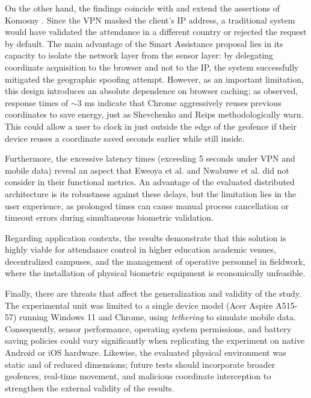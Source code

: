 \documentclass[runningheads]{llncs}
\begin{document}
On the other hand, the findings coincide with and extend the assertions of Komosny \cite{komosny2023}. Since the VPN masked the client's IP address, a traditional system would have validated the attendance in a different country or rejected the request by default. The main advantage of the Smart Assistance proposal lies in its capacity to isolate the network layer from the sensor layer: by delegating coordinate acquisition to the browser and not to the IP, the system successfully mitigated the geographic spoofing attempt. However, as an important limitation, this design introduces an absolute dependence on browser caching; as observed, response times of $\sim$3 ms indicate that Chrome aggressively reuses previous coordinates to save energy, just as Shevchenko and Reips \cite{shevchenko2024} methodologically warn. This could allow a user to clock in just outside the edge of the geofence if their device reuses a coordinate saved seconds earlier while still inside.

Furthermore, the excessive latency times (exceeding 5 seconds under VPN and mobile data) reveal an aspect that Eweoya et al. \cite{eweoya2025} and Nwabuwe et al. \cite{nwabuwe2023} did not consider in their functional metrics. An advantage of the evaluated distributed architecture is its robustness against these delays, but the limitation lies in the user experience, as prolonged times can cause manual process cancellation or timeout errors during simultaneous biometric validation.

Regarding application contexts, the results demonstrate that this solution is highly viable for attendance control in higher education academic venues, decentralized campuses, and the management of operative personnel in fieldwork, where the installation of physical biometric equipment is economically unfeasible.

Finally, there are threats that affect the generalization and validity of the study. The experimental unit was limited to a single device model (Acer Aspire A515-57) running Windows 11 and Chrome, using \textit{tethering} to simulate mobile data. Consequently, sensor performance, operating system permissions, and battery saving policies could vary significantly when replicating the experiment on native Android or iOS hardware. Likewise, the evaluated physical environment was static and of reduced dimensions; future tests should incorporate broader geofences, real-time movement, and malicious coordinate interception to strengthen the external validity of the results.
\end{document}
